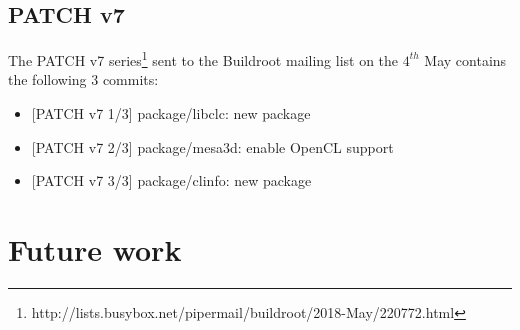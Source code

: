\documentclass[12pt,a4paper,oneside]{article}
\begin{document}
\subsection*{PATCH v7}
The PATCH v7 series\footnote{http://lists.busybox.net/pipermail/buildroot/2018-May/220772.html}
sent to the Buildroot mailing list on the $4^{th}$ May contains the following
3 commits:
\begin{itemize}
  \item {[PATCH v7 1/3]} package/libclc: new package
  \item {[PATCH v7 2/3]} package/mesa3d: enable OpenCL support
  \item {[PATCH v7 3/3]} package/clinfo: new package
\end{itemize}

\newpage
\section{Future work}
\end{document}

